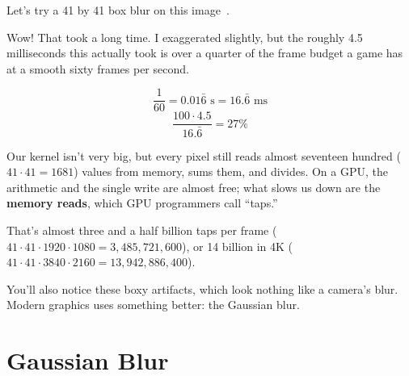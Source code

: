 \documentclass{article}
\begin{document}
Let's try a 41 by 41 box blur on this image~\cite{youtube:acerola-blur}.

Wow! That took a long time. I exaggerated slightly, but the roughly 4.5 milliseconds this actually took is over a quarter of the frame budget a game has at a smooth sixty frames per second.

\[
    \frac{1}{60} = 0.01\bar{6} \text{ s} = 16.\bar{6} \text{ ms}
\]
\[
    \frac{100 \cdot 4.5}{16.\bar{6}} = 27\%
\]

Our kernel isn't very big, but every pixel still reads almost seventeen hundred ($41\cdot41=1681$) values from memory, sums them, and divides. On a GPU, the arithmetic and the single write are almost free; what slows us down are the \textbf{memory reads}, which GPU programmers call ``taps.''

That's almost three and a half billion taps per frame ($41\cdot41\cdot1920\cdot1080=3{,}485{,}721{,}600$), or 14 billion in 4K ($41\cdot41\cdot3840\cdot2160=13{,}942{,}886{,}400$).

You'll also notice these boxy artifacts, which look nothing like a camera's blur. Modern graphics uses something better: the Gaussian blur.


\section{Gaussian Blur}
\end{document}
